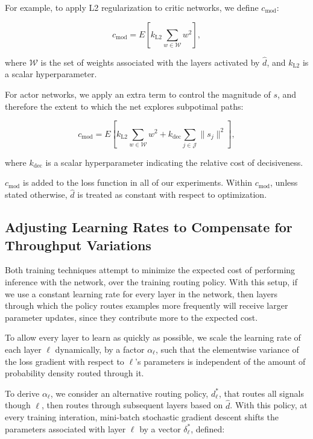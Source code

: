 \documentclass{article}
\begin{document}
  For example, to apply L2 regularization to critic networks, we define $c_\text{mod}$:
  
  \begin{equation}
    c_\text{mod} = E \left[
      k_\text{L2} \sum_{w\in\mathcal{W}} w^2
    \right],
  \end{equation}
  
  where $\mathcal{W}$ is the set of weights associated with the layers activated by $\hat{d}$, and $k_\text{L2}$ is a scalar hyperparameter.
    
  For actor networks, we apply an extra term to control the magnitude of $s$, and therefore the extent to which the net explores subpotimal paths:
  
  \begin{equation}
    c_\text{mod} = E \left[
      k_\text{L2} \sum_{w\in\mathcal{W}} w^2 +
      k_\text{dec} \sum_{j\in\mathcal{J}} \|s_j\|^2
    \right],
  \end{equation}
  
  where $k_\text{dec}$ is a scalar hyperparameter indicating the relative cost of decisiveness.

  $c_\text{mod}$ is added to the loss function in all of our experiments. Within $c_\text{mod}$, unless stated otherwise, $\hat{d}$ is treated as constant with respect to optimization.

  \subsection{Adjusting Learning Rates to Compensate for Throughput Variations}
  \label{subsec:optimization}
  
  Both training techniques attempt to minimize the expected cost of performing inference with the network, over the training routing policy. With this setup, if we use a constant learning rate for every layer in the network, then layers through which the policy routes examples more frequently will receive larger parameter updates, since they contribute more to the expected cost.

  To allow every layer to learn as quickly as possible, we scale the learning rate of each layer $\ell$ dynamically, by a factor $\alpha_\ell$, such that the elementwise variance of the loss gradient with respect to $\ell$'s parameters is independent of the amount of probability density routed through it.
 
  To derive $\alpha_\ell$, we consider an alternative routing policy, $d_\ell^\ast$, that routes all signals though $\ell$, then routes through subsequent layers based on $\hat{d}$. With this policy, at every training interation, mini-batch stochastic gradient descent shifts the parameters associated with layer $\ell$ by a vector $\delta_\ell^\ast$, defined:
\end{document}
